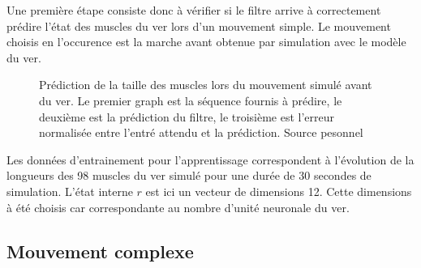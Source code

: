Une première étape consiste donc à vérifier si le filtre arrive à correctement
prédire l'état des muscles du ver lors d'un mouvement simple. Le mouvement
choisis en l'occurence est la marche avant obtenue par simulation avec le
modèle du ver.

\begin{figure}[ht]
   \begin{center}
   \end{center}
   \caption[Prédiction de de la taille des muscles lors du mouvement simulé
   avant du ver]{Prédiction de la taille des muscles lors du mouvement simulé
   avant du ver. Le premier graph est la séquence fournis à prédire, le
   deuxième est la prédiction du filtre, le troisième est l'erreur normalisée
   entre l'entré attendu et la prédiction. Source pesonnel}
   \label{fig:sequence_ver_complet}
\end{figure}

Les données d'entrainement pour l'apprentissage correspondent à l'évolution de
la longueurs des 98 muscles du ver simulé pour une durée de 30 secondes de
simulation. L'état interne $r$ est ici un vecteur de dimensions 12. Cette dimensions
à été choisis car correspondante au nombre d'unité neuronale du ver.


\subsection{Mouvement complexe} %
\label{sub:Mouvement complexe}



